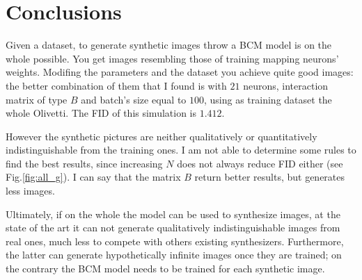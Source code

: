 \documentclass[a4paper,12pt]{article}
\begin{document}
\section{Conclusions}
Given a dataset, to generate synthetic images throw a BCM model is on the whole possible.
You get images resembling those of training mapping neurons' weights.
Modifing the parameters and the dataset you achieve quite good images: the better combination of them that I found is with $21$ neurons, interaction matrix of type $B$ and batch's size equal to $100$, using as training dataset the whole Olivetti.
The FID of this simulation is $1.412$.

However the synthetic pictures are neither qualitatively or quantitatively indistinguishable from the training ones.
I am not able to determine some rules to find the best results, since increasing $N$ does not always reduce FID either (see Fig.\ref{fig:all_g}).
I can say that the matrix $B$ return better results, but generates less images.

Ultimately, if on the whole the model can be used to synthesize images, at the state of the art it can not generate qualitatively indistinguishable images from real ones, much less to compete with others existing synthesizers.
Furthermore, the latter can generate hypothetically infinite images once they are trained; on the contrary the BCM model needs to be trained for each synthetic image.

\clearpage
{}
\printbibliography
\end{document}
